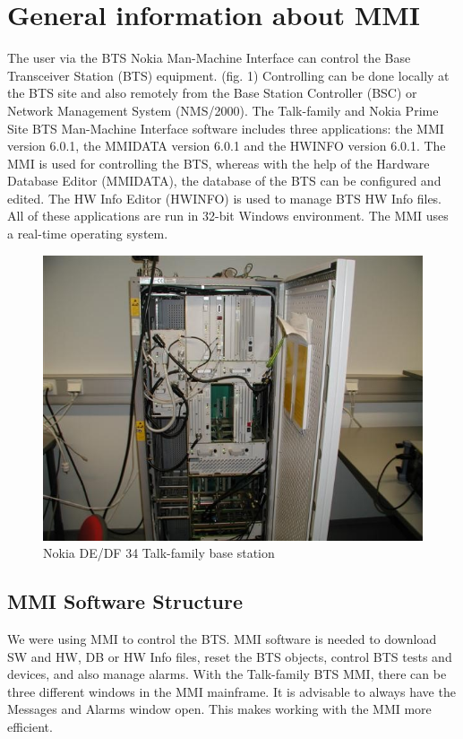 \documentclass[english]{article}
\begin{document}
\section{General information about MMI}
The user via the BTS Nokia Man-Machine Interface can control the Base Transceiver Station (BTS) equipment. (fig. 1) Controlling can be done locally at the BTS site and also remotely from the Base Station Controller (BSC) or Network Management System (NMS/2000). The Talk-family and Nokia Prime Site BTS Man-Machine Interface software includes three applications: the MMI version 6.0.1, the MMIDATA version 6.0.1 and the HWINFO version 6.0.1. The MMI is used for controlling the BTS, whereas with the help of the Hardware Database Editor (MMIDATA), the database of the BTS can be configured and edited. The HW Info Editor (HWINFO) is used to manage BTS HW Info files. All of these applications are run in 32-bit Windows environment. The MMI uses a real-time operating system.
\begin{figure}
\centerline{\includegraphics[scale=0.8]{GSM/Pic1}}
\caption{ Nokia DE/DF 34 Talk-family base station}
\end{figure}
\subsection{MMI Software Structure}
We were using MMI to control the BTS. MMI software is needed to download SW and HW, DB or HW Info files, reset the BTS objects, control BTS tests and devices, and also manage alarms. With the Talk-family BTS MMI, there can be three different windows in the MMI mainframe. It is advisable to always have the Messages and Alarms window open. This makes working with the MMI more efficient.
\end{document}
